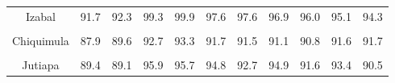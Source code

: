 {\begin{tabular}[t]{ccccccccccc}
Izabal & 91.7 & 92.3 & 99.3 & 99.9 & 97.6 & 97.6 & 96.9 & 96.0 & 95.1 & 94.3\\
\cellcolor[HTML]{B6B3FF}{Zacapa} & \cellcolor[HTML]{B6B3FF}{86.8} & \cellcolor[HTML]{B6B3FF}{90.0} & \cellcolor[HTML]{B6B3FF}{92.7} & \cellcolor[HTML]{B6B3FF}{96.6} & \cellcolor[HTML]{B6B3FF}{91.6} & \cellcolor[HTML]{B6B3FF}{94.0} & \cellcolor[HTML]{B6B3FF}{91.2} & \cellcolor[HTML]{B6B3FF}{93.3} & \cellcolor[HTML]{B6B3FF}{90.6} & \cellcolor[HTML]{B6B3FF}{91.9}\\
Chiquimula & 87.9 & 89.6 & 92.7 & 93.3 & 91.7 & 91.5 & 91.1 & 90.8 & 91.6 & 91.7\\
\cellcolor[HTML]{B6B3FF}{Jalapa} & \cellcolor[HTML]{B6B3FF}{84.8} & \cellcolor[HTML]{B6B3FF}{85.3} & \cellcolor[HTML]{B6B3FF}{89.5} & \cellcolor[HTML]{B6B3FF}{89.7} & \cellcolor[HTML]{B6B3FF}{88.5} & \cellcolor[HTML]{B6B3FF}{88.7} & \cellcolor[HTML]{B6B3FF}{89.8} & \cellcolor[HTML]{B6B3FF}{88.7} & \cellcolor[HTML]{B6B3FF}{90.2} & \cellcolor[HTML]{B6B3FF}{89.0}\\
Jutiapa & 89.4 & 89.1 & 95.9 & 95.7 & 94.8 & 92.7 & 94.9 & 91.6 & 93.4 & 90.5\\
\bottomrule
\end{tabular}
}